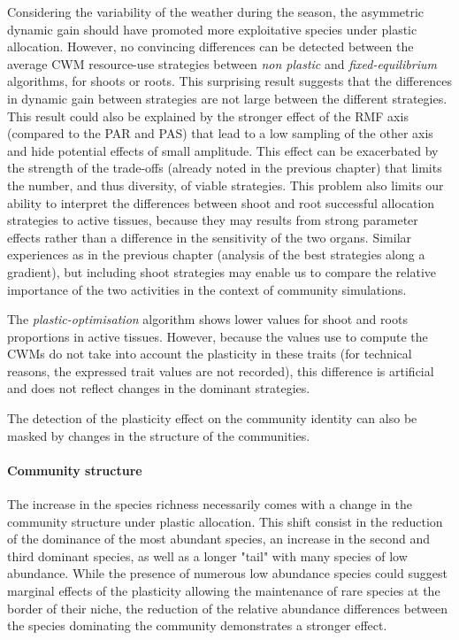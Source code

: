 Considering the variability of the weather during the season, the asymmetric dynamic gain should have promoted more exploitative species under plastic allocation. However, no convincing differences can be detected between the average CWM resource-use strategies between \textit{non plastic} and \textit{fixed-equilibrium} algorithms, for shoots or roots. This surprising result suggests that the differences in dynamic gain between strategies are not large between the different strategies. This result could also be explained by the stronger effect of the RMF axis (compared to the PAR and PAS) that lead to a low sampling of the other axis and hide potential effects of small amplitude. This effect can be exacerbated by the strength of the trade-offs (already noted in the previous chapter) that limits the number, and thus diversity, of viable strategies. This problem also limits our ability to interpret the differences between shoot and root successful allocation strategies to active tissues, because they may results from strong parameter effects rather than a difference in the sensitivity of the two organs. Similar experiences as in the previous chapter (analysis of the best strategies along a gradient), but including shoot strategies may enable us to compare the relative importance of the two activities in the context of community simulations.

The \textit{plastic-optimisation} algorithm shows lower values for shoot and roots proportions in active tissues. However, because the values use to compute the CWMs do not take into account the plasticity in these traits (for technical reasons, the expressed trait values are not recorded), this difference is artificial and does not reflect changes in the dominant strategies.

The detection of the plasticity effect on the community identity can also be masked by changes in the structure of the communities.



\paragraph{Community structure}

The increase in the species richness necessarily comes with a change in the community structure under plastic allocation. This shift consist in the reduction of the dominance of the most abundant species, an increase in the second and third dominant species, as well as a longer "tail" with many species of low abundance. While the presence of numerous low abundance species could suggest marginal effects  of the plasticity allowing the maintenance of rare species at the border of their niche, the reduction of the relative abundance differences between the species dominating the community demonstrates a stronger effect. 

